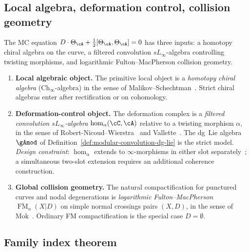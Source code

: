 \subsection*{Local algebra, deformation control, collision geometry}
\label{sec:guide-three-pillars}

The MC equation
$D\cdot\Theta_\cA + \tfrac{1}{2}[\Theta_\cA,\Theta_\cA] = 0$
has three inputs: a homotopy chiral algebra on the curve, a filtered
convolution $sL_\infty$-algebra controlling twisting morphisms, and
logarithmic Fulton--MacPherson collision geometry.

\begin{enumerate}[label=\textup{(\Alph*)}]
\item \textbf{Local algebraic object.} The primitive local
 object is a \emph{homotopy chiral algebra}
 ($\mathrm{Ch}_\infty$-algebra) in the sense of
 Malikov--Schechtman~\cite{MS24}. Strict chiral algebras enter after
 rectification or on cohomology.

\item \textbf{Deformation-control object.} The deformation complex is a
 \emph{filtered convolution $sL_\infty$-algebra}
 $\operatorname{hom}_\alpha(\cC, \cA)$ relative to a twisting morphism
 $\alpha$, in the sense of Robert-Nicoud--Wierstra~\cite{RNW19} and
 Vallette~\cite{Val16}. The dg~Lie algebra $\gAmod$ of
 Definition~\ref{def:modular-convolution-dg-lie} is the strict model.
 \emph{Design constraint}:
 $\operatorname{hom}_\alpha$ extends to $\infty$-morphisms in either
 slot separately~\cite[Section~6]{RNW19}; a simultaneous two-slot
 extension requires an additional coherence construction.

\item \textbf{Global collision geometry.} The natural
 compactification for punctured curves and nodal degenerations
 is \emph{logarithmic Fulton--MacPherson}
 $\overline{\operatorname{FM}}_n(X|D)$ on simple normal crossings pairs
 $(X, D)$, in the sense of Mok~\cite{Mok25}. Ordinary FM
 compactification is the special case $D = \emptyset$.
\end{enumerate}

\subsection*{Family index theorem}


